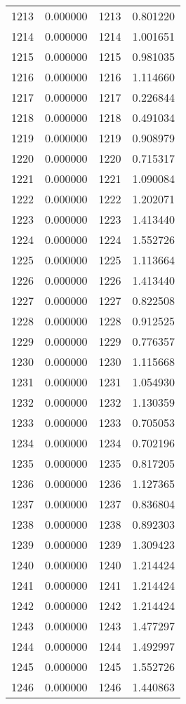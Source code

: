 \documentclass[12pt]{article}
\begin{document}
\begin{longtable}{@{}cccc@{}}
1213 & 0.000000 & 1213 & 0.801220 \\
1214 & 0.000000 & 1214 & 1.001651 \\
1215 & 0.000000 & 1215 & 0.981035 \\
1216 & 0.000000 & 1216 & 1.114660 \\
1217 & 0.000000 & 1217 & 0.226844 \\
1218 & 0.000000 & 1218 & 0.491034 \\
1219 & 0.000000 & 1219 & 0.908979 \\
1220 & 0.000000 & 1220 & 0.715317 \\
1221 & 0.000000 & 1221 & 1.090084 \\
1222 & 0.000000 & 1222 & 1.202071 \\
1223 & 0.000000 & 1223 & 1.413440 \\
1224 & 0.000000 & 1224 & 1.552726 \\
1225 & 0.000000 & 1225 & 1.113664 \\
1226 & 0.000000 & 1226 & 1.413440 \\
1227 & 0.000000 & 1227 & 0.822508 \\
1228 & 0.000000 & 1228 & 0.912525 \\
1229 & 0.000000 & 1229 & 0.776357 \\
1230 & 0.000000 & 1230 & 1.115668 \\
1231 & 0.000000 & 1231 & 1.054930 \\
1232 & 0.000000 & 1232 & 1.130359 \\
1233 & 0.000000 & 1233 & 0.705053 \\
1234 & 0.000000 & 1234 & 0.702196 \\
1235 & 0.000000 & 1235 & 0.817205 \\
1236 & 0.000000 & 1236 & 1.127365 \\
1237 & 0.000000 & 1237 & 0.836804 \\
1238 & 0.000000 & 1238 & 0.892303 \\
1239 & 0.000000 & 1239 & 1.309423 \\
1240 & 0.000000 & 1240 & 1.214424 \\
1241 & 0.000000 & 1241 & 1.214424 \\
1242 & 0.000000 & 1242 & 1.214424 \\
1243 & 0.000000 & 1243 & 1.477297 \\
1244 & 0.000000 & 1244 & 1.492997 \\
1245 & 0.000000 & 1245 & 1.552726 \\
1246 & 0.000000 & 1246 & 1.440863 \\

\end{longtable}
\end{document}
